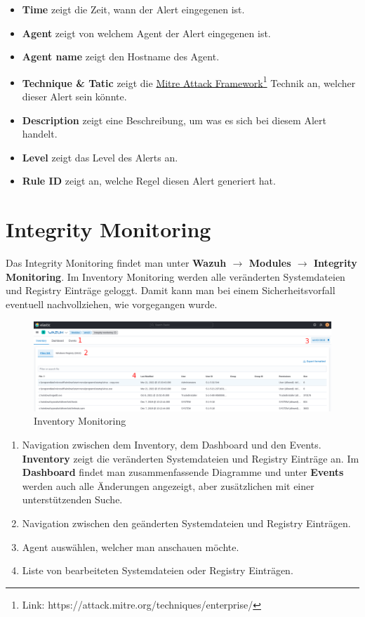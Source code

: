 \begin{itemize}
    \item \textbf{Time} zeigt die Zeit, wann der Alert eingegenen ist.
    \item \textbf{Agent} zeigt von welchem Agent der Alert eingegenen ist.
    \item \textbf{Agent name} zeigt den Hostname des Agent.
    \item \textbf{Technique \& Tatic} zeigt die \href{https://attack.mitre.org/techniques/enterprise/}{Mitre Attack Framework}\footnote{Link: https://attack.mitre.org/techniques/enterprise/} Technik an, welcher dieser Alert sein könnte.
    \item \textbf{Description} zeigt eine Beschreibung, um was es sich bei diesem Alert handelt.
    \item \textbf{Level} zeigt das Level des Alerts an. 
    \item \textbf{Rule ID} zeigt an, welche Regel diesen Alert generiert hat.
\end{itemize}

\section{Integrity Monitoring}
Das Integrity Monitoring findet man unter \textbf{Wazuh $\rightarrow$ Modules $\rightarrow$ Integrity Monitoring}.
Im Inventory Monitoring werden alle veränderten Systemdateien und Registry Einträge geloggt. 
Damit kann man bei einem Sicherheitsvorfall eventuell nachvollziehen, wie vorgegangen wurde.

\begin{figure}[H]
    \centering
    \includegraphics[width=\linewidth]{../img/wazuh-im-inventory.png}
    \caption{Inventory Monitoring}
\end{figure}

\begin{enumerate}
    \item Navigation zwischen dem Inventory, dem Dashboard und den Events.
    \textbf{Inventory} zeigt die veränderten Systemdateien und Registry Einträge an. Im \textbf{Dashboard} findet man zusammenfassende Diagramme und unter \textbf{Events} werden auch alle Änderungen angezeigt, aber zusätzlichen mit einer unterstützenden Suche. 
    \item Navigation zwischen den geänderten Systemdateien und Registry Einträgen.
    \item Agent auswählen, welcher man anschauen möchte.
    \item Liste von bearbeiteten Systemdateien oder Registry Einträgen.
\end{enumerate}

